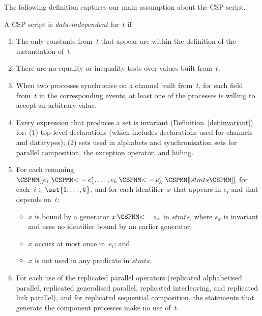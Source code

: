 The following definition captures our main assumption about the CSP script.
%
\begin{definition}
\label{defn:data-independent}
A CSP script is \emph{data-independent} for~$t$ if
\begin{enumerate}
\item The only constants from~$t$ that appear are within the definition
  of the instantiation of~$t$.

\item There are no equality or inequality tests over values built from~$t$.

\item\label{item:sync} When two processes synchronise on a channel built
  from~$t$, for each field from~$t$ in the corresponding events, at least one
  of the processes is willing to accept an arbitrary value.

\item\label{item:di-invariant} Every expression that produces a set is
  invariant (Definition~\ref{def:invariant}) for: (1) top-level declarations
  (which includes declarations used for channels and datatypes); (2) sets used
  in alphabets and synchronisation sets for parallel composition, the
  exception operator, and hiding.

\item\label{item:di-renaming} For each renaming $\rename{e_1 \lArrow e_1',
  \ldots, e_k \lArrow e_k' ~ \M\| stmts}$, for each~$i \in \set{1,\ldots,k}$,
  and for each identifier~$x$ that appears in $e_i$ and that depends on~$t$:
%
  \begin{itemize}
  \item $x$ is bound by a generator $x \,\M{<-}\, s_x$ in $stmts$, where $s_x$
    is invariant and uses no identifier bound by an earlier generator;

  \item $x$ occurs at most once in~$e_i$; and

  \item $x$ is not used in any predicate in $stmts$.
  \end{itemize}

\item\label{item:indexing} For each use of the replicated parallel operators
  (replicated alphabetised parallel, replicated generalised parallel,
  replicated interleaving, and replicated link parallel), and for replicated
  sequential composition, the statements that generate the component processes
  make no use of~$t$. 



\end{enumerate}
\end{definition}
